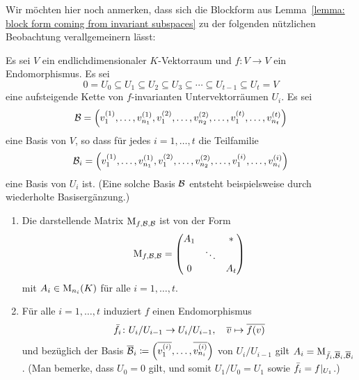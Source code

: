 Wir möchten hier noch anmerken, dass sich die Blockform aus Lemma~\ref{lemma: block form coming from invariant subspaces} zu der folgenden nützlichen Beobachtung verallgemeinern lässt:

\begin{proposition}
  \label{proposition: better block form coming from chain of invariant subspaces}
  Es sei $V$ ein endlichdimensionaler $K$-Vektorraum und $f \colon V \to V$ ein Endomorphismus.
  Es sei
  \[
              0
    =         U_0
    \subseteq U_1
    \subseteq U_2
    \subseteq U_3
    \subseteq \dotsb
    \subseteq U_{t-1}
    \subseteq U_t
    =         V
  \]
  eine aufsteigende Kette von $f$-invarianten Untervektorräumen $U_i$.
  Es sei
  \[
      \mathcal{B}
    = \left(
        v^{(1)}_1, \dotsc, v^{(1)}_{n_1},
        v^{(2)}_1, \dotsc, v^{(2)}_{n_2},
        \dotsc,
        v^{(t)}_1, \dotsc, v^{(t)}_{n_t}
      \right)
  \]
  eine Basis von $V$, so dass für jedes $i = 1, \dotsc, t$ die Teilfamilie
  \[
      \mathcal{B}_i
    = \left(
        v^{(1)}_1, \dotsc, v^{(1)}_{n_1},
        v^{(2)}_1, \dotsc, v^{(2)}_{n_2},
        \dotsc,
        v^{(i)}_1, \dotsc, v^{(i)}_{n_i}
      \right)
  \]
  eine Basis von $U_i$ ist.
  (Eine solche Basis $\mathcal{B}$ entsteht beispielsweise durch wiederholte Basisergänzung.)
  \begin{enumerate}
    \item
      Die darstellende Matrix $\operatorname{M}_{f, \mathcal{B}, \mathcal{B}}$ ist von der Form
      \begin{equation}
        \label{equation: general block matrix}
          \operatorname{M}_{f, \mathcal{B}, \mathcal{B}}
        = \begin{pmatrix}
            A_1 &         & *
            \\
                & \ddots  &
            \\
            0   &         & A_t
          \end{pmatrix}
      \end{equation}
      mit $A_i \in \operatorname{M}_{n_i}(K)$ für alle $i = 1, \dotsc, t$.
    \item
      Für alle $i = 1, \dotsc, t$ induziert $f$ einen Endomorphismus
      \[
                \bar{f}_i
        \colon  U_i/U_{i-1} \to U_i/U_{i-1},
        \quad   \overline{v}
        \mapsto \overline{f(v)}
      \]
      und bezüglich der Basis $\overline{\mathcal{B}}_i \coloneqq \left( \overline{v^{(i)}_1}, \dotsc, \overline{v^{(i)}_{n_i}} \right)$ von $U_i/U_{i-1}$ gilt $A_i = \operatorname{M}_{\bar{f}_i, \overline{\mathcal{B}}_i, \overline{\mathcal{B}}_i}$.
      (Man bemerke, dass $U_0 = 0$ gilt, und somit $U_1/U_0 = U_1$ sowie $\bar{f}_i = f|_{U_1}$.)
  \end{enumerate}
\end{proposition}

